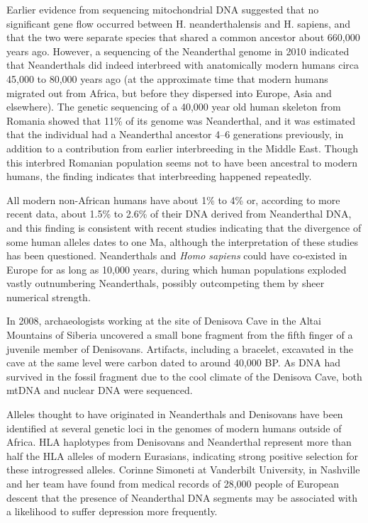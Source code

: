 Earlier evidence from sequencing mitochondrial DNA suggested that no significant gene flow occurred between H. neanderthalensis and H. sapiens, and that the two were separate species that shared a common ancestor about 660,000 years ago. However, a sequencing of the Neanderthal genome in 2010 indicated that Neanderthals did indeed interbreed with anatomically modern humans circa 45,000 to 80,000 years ago (at the approximate time that modern humans migrated out from Africa, but before they dispersed into Europe, Asia and elsewhere). The genetic sequencing of a 40,000 year old human skeleton from Romania showed that 11\% of its genome was Neanderthal, and it was estimated that the individual had a Neanderthal ancestor 4--6 generations previously, in addition to a contribution from earlier interbreeding in the Middle East. Though this interbred Romanian population seems not to have been ancestral to modern humans, the finding indicates that interbreeding happened repeatedly.

All modern non-African humans have about 1\% to 4\% or, according to more recent data, about 1.5\% to 2.6\% of their DNA derived from Neanderthal DNA, and this finding is consistent with recent studies indicating that the divergence of some human alleles dates to one Ma, although the interpretation of these studies has been questioned. Neanderthals and \emph{Homo sapiens} could have co-existed in Europe for as long as 10,000 years, during which human populations exploded vastly outnumbering Neanderthals, possibly outcompeting them by sheer numerical strength.

In 2008, archaeologists working at the site of Denisova Cave in the Altai Mountains of Siberia uncovered a small bone fragment from the fifth finger of a juvenile member of Denisovans. Artifacts, including a bracelet, excavated in the cave at the same level were carbon dated to around 40,000 BP. As DNA had survived in the fossil fragment due to the cool climate of the Denisova Cave, both mtDNA and nuclear DNA were sequenced.

Alleles thought to have originated in Neanderthals and Denisovans have been identified at several genetic loci in the genomes of modern humans outside of Africa. HLA haplotypes from Denisovans and Neanderthal represent more than half the HLA alleles of modern Eurasians, indicating strong positive selection for these introgressed alleles. Corinne Simoneti at Vanderbilt University, in Nashville and her team have found from medical records of 28,000 people of European descent that the presence of Neanderthal DNA segments may be associated with a likelihood to suffer depression more frequently.

